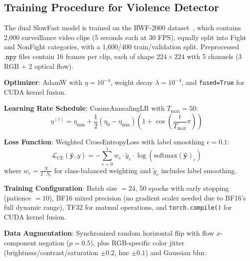 \documentclass[11pt,a4paper]{article}
\newcommand{\softmax}{\mathrm{softmax}}
\begin{document}
\subsection{Training Procedure for Violence Detector}
\label{subsec:violence_training}

The dual SlowFast model is trained on the RWF-2000 dataset~\cite{rwf2000}, which contains 2,000 surveillance video clips (5 seconds each at 30 FPS), equally split into Fight and NonFight categories, with a 1,600/400 train/validation split. Preprocessed $\texttt{.npy}$ files contain 16 frames per clip, each of shape $224 \times 224$ with 5 channels (3 RGB + 2 optical flow).

\textbf{Optimizer}: AdamW with $\eta = 10^{-4}$, weight decay $\lambda = 10^{-4}$, and \texttt{fused=True} for CUDA kernel fusion.

\textbf{Learning Rate Schedule}: CosineAnnealingLR with $T_{\max} = 50$:
\begin{equation}
\eta^{(t)} = \eta_{\min} + \frac{1}{2}(\eta_0 - \eta_{\min})\left(1 + \cos\!\left(\frac{t}{T_{\max}}\pi\right)\right)
\end{equation}

\textbf{Loss Function}: Weighted CrossEntropyLoss with label smoothing $\epsilon = 0.1$:
\begin{equation}
\mathcal{L}_{\text{CE}}(\hat{\mathbf{y}}, y) = -\sum_{c=0}^{1} w_c \cdot \tilde{y}_c \cdot \log(\softmax(\hat{\mathbf{y}})_c)
\label{eq:ce_loss}
\end{equation}
where $w_c = \frac{N}{2 \cdot N_c}$ for class-balanced weighting and $\tilde{y}_c$ includes label smoothing.

\textbf{Training Configuration}: Batch size $= 24$, 50 epochs with early stopping (patience $= 10$), BF16 mixed precision (no gradient scaler needed due to BF16's full dynamic range), TF32 for matmul operations, and \texttt{torch.compile()} for CUDA kernel fusion.

\textbf{Data Augmentation}: Synchronized random horizontal flip with flow $x$-component negation ($p = 0.5$), plus RGB-specific color jitter (brightness/contrast/saturation $\pm 0.2$, hue $\pm 0.1$) and Gaussian blur.
\end{document}
